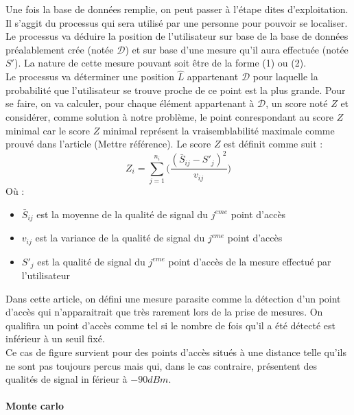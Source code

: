 \documentclass[11pt,journal,compsoc]{IEEEtran}
\begin{document}
        Une fois la base de données remplie, on peut passer à l'étape dites d'exploitation. Il s'aggit du processus qui sera utilisé par une personne pour pouvoir se localiser.\\
        Le processus va déduire la position de l'utilisateur sur base de la base de données préalablement crée (notée $\mathcal{D}$) et sur base d'une mesure qu'il aura effectuée (notée $S'$). La nature de cette mesure pouvant soit être de la forme (1) ou (2).\\
        Le processus va déterminer une position $\hat{L}$ appartenant $\mathcal{D}$ pour laquelle la probabilité que l'utilisateur se trouve proche de ce point est la plus grande. Pour se faire, on va calculer, pour chaque élément appartenant à $\mathcal{D}$, un score noté $Z$ et considérer, comme solution à notre problème, le point conrespondant au score $Z$ minimal car le score $Z$ minimal représent la vraisemblabilité maximale comme prouvé dans l'article (Mettre référence). Le score $Z$ est définit comme suit :
        \[Z_{i} = \sum\limits_{j = 1}^{n_{i}}\bigg(\frac{(\bar{S}_{ij}-S'_{j})^{2}}{v_{ij}}\bigg)\]
        Où :
        \begin{itemize}
          \item $\bar{S}_{ij}$ est la moyenne de la qualité de signal du $j^{eme}$ point d'accès
          \item $v_{ij}$ est la variance de la qualité de signal du $j^{eme}$ point d'accès
          \item $S'_{j}$ est la qualité de signal du $j^{eme}$ point d'accès de la mesure effectué par l'utilisateur
        \end{itemize}
        
        \begin{tcolorbox}[title = Mesures parasites]
          Dans cette article, on défini une mesure parasite comme la détection d'un point d'accès qui n'apparaitrait que très rarement lors de la prise de mesures. On qualifira un point d'accès comme tel si le nombre de fois qu'il a été détecté est inférieur à un seuil fixé.
          \\
          Ce cas de figure survient pour des points d'accès situés à une distance telle qu'ils ne sont pas toujours percus mais qui, dans le cas contraire, présentent des qualités de signal in férieur à $-90 dBm$.
        \end{tcolorbox}
      \paragraph{Monte carlo}
\end{document}
